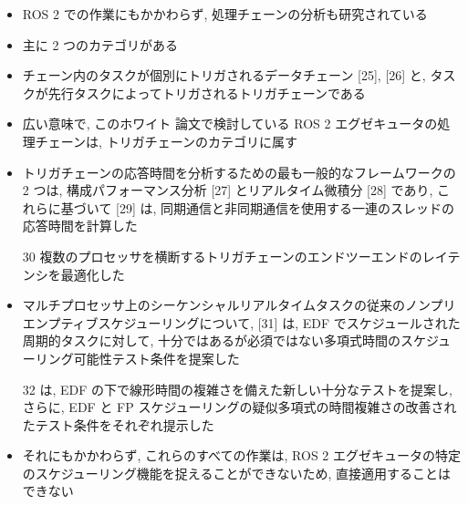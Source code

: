 \begin{frame}{}
    \begin{itemize}
        \item ROS 2 での作業にもかかわらず, 処理チェーンの分析も研究されている
\item 主に 2 つのカテゴリがある
\item チェーン内のタスクが個別にトリガされるデータチェーン [25], [26] と, タスクが先行タスクによってトリガされるトリガチェーンである
\item 広い意味で, このホワイト 論文で検討している ROS 2 エグゼキュータの処理チェーンは, トリガチェーンのカテゴリに属す
\item トリガチェーンの応答時間を分析するための最も一般的なフレームワークの 2 つは, 構成パフォーマンス分析 [27] とリアルタイム微積分 [28] であり, これらに基づいて [29] は, 同期通信と非同期通信を使用する一連のスレッドの応答時間を計算した
\item [30] 複数のプロセッサを横断するトリガチェーンのエンドツーエンドのレイテンシを最適化した
\item マルチプロセッサ上のシーケンシャルリアルタイムタスクの従来のノンプリエンプティブスケジューリングについて, [31] は, EDF でスケジュールされた周期的タスクに対して, 十分ではあるが必須ではない多項式時間のスケジューリング可能性テスト条件を提案した
\item [32] は, EDF の下で線形時間の複雑さを備えた新しい十分なテストを提案し, さらに, EDF と FP スケジューリングの疑似多項式の時間複雑さの改善されたテスト条件をそれぞれ提示した
\item それにもかかわらず, これらのすべての作業は, ROS 2 エグゼキュータの特定のスケジューリング機能を捉えることができないため, 直接適用することはできない
    \end{itemize}
\end{frame}
